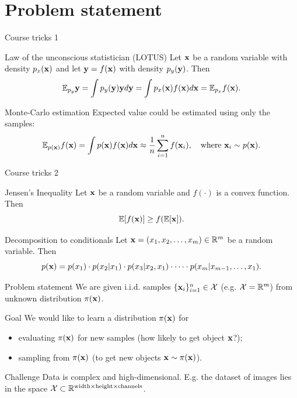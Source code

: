 \section{Problem statement}
\begin{frame}{Course tricks 1}
	\begin{block}{Law of the unconscious statistician (LOTUS)}
		Let $\mathbf{x}$ be a random variable with density $p_x(\mathbf{x})$ and let $\mathbf{y}=f(\mathbf{x})$ with density $p_y(\mathbf{y})$. Then
		\[
			\mathbb{E}_{p_y} \mathbf{y} = \int p_y(\mathbf{y}) \mathbf{y} d \mathbf{y} = \int p_x(\mathbf{x}) f(\mathbf{x}) d \mathbf{x} = \mathbb{E}_{p_x} f(\mathbf{x}).
		\]
	\end{block}
	\begin{block}{Monte-Carlo estimation}
		Expected value could be estimated using only the samples:
		\[
			\mathbb{E}_{p(\mathbf{x})} f(\mathbf{x}) = \int p(\mathbf{x}) f(\mathbf{x}) d \mathbf{x} \approx \frac{1}{n} \sum_{i=1}^n f(\mathbf{x}_i), \quad 
			\text{where } \mathbf{x}_i \sim p(\mathbf{x}).
		\]
	\end{block}
\end{frame}
\begin{frame}{Course tricks 2}
	\begin{block}{Jensen's Inequality}
		Let $\mathbf{x}$ be a random variable and $f(\cdot)$ is a convex function. Then
		\[
			\mathbb{E} [f(\mathbf{x})] \geq f(\mathbb{E}[\mathbf{x}]).
		\]
	\end{block}
	\begin{block}{Decomposition to conditionals}
	Let $\mathbf{x} = (x_1, x_2, \dots, x_m) \in \mathbb{R}^m$ be a random variable. Then 
	\[
		p(\mathbf{x}) = p(x_1) \cdot p(x_2 | x_1) \cdot p(x_3 | x_2, x_1) \cdot \dots \cdot p(x_m|x_{m-1},\dots,x_1).
	\]
	\end{block}
\end{frame}
\begin{frame}{Problem statement}
	We are given i.i.d. samples $\{\mathbf{x}_i\}_{i=1}^n \in \mathcal{X}$ (e.g. $\mathcal{X} = \mathbb{R}^m$) from unknown distribution $\pi(\mathbf{x})$.
	
	\begin{block}{Goal}
		We would like to learn a distribution $\pi(\mathbf{x})$ for 
		\begin{itemize}
		    \item evaluating $\pi(\mathbf{x})$ for new samples (how likely to get object $\mathbf{x}$?);
		    \item sampling from $\pi(\mathbf{x})$ (to get new objects $\mathbf{x} \sim \pi(\mathbf{x})$).
		\end{itemize}
	\end{block}
	\begin{block}{Challenge}
		 Data is complex and high-dimensional. E.g. the dataset of images lies in the space $\mathcal{X} \subset \mathbb{R}^{\text{width} \times \text{height} \times \text{channels}}$.
	\end{block}
\end{frame}
